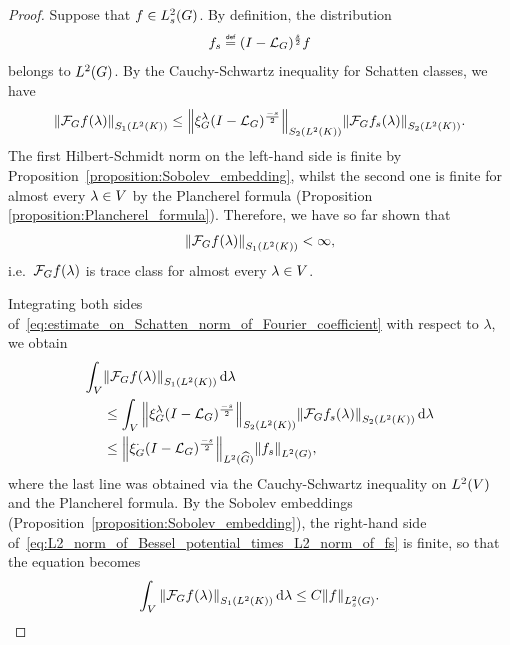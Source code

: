 \begin{proof}
    Suppose that $f \in \Sobolev s$.
    By definition, the distribution
    \begin{align*}
        f_s \defeq \BesselPotential s f
    \end{align*}
    belongs to $\Lebesgue 2 \Group$.
    By the Cauchy-Schwartz inequality for Schatten classes,
    we have
    \begin{align}
        \norm [\SchattenClasses 1 {\Lebesgue 2 \CompactGroup}] {\Fourier f(\lambda)}
        \leq
        \norm [\SchattenClasses 2 {\Lebesgue 2 \CompactGroup}] {\Rep \lambda \BesselPotential {-s}}
        \norm [\SchattenClasses 2 {\Lebesgue 2 \CompactGroup}] {\Fourier f_s(\lambda)}.
        \label{eq:estimate_on_Schatten_norm_of_Fourier_coefficient}
    \end{align}
    The first Hilbert-Schmidt norm on the left-hand side is finite by Proposition~\ref{proposition:Sobolev_embedding},
    whilst the second one is finite for almost every $\lambda \in \VectorSpace$ by the Plancherel formula (Proposition \ref{proposition:Plancherel_formula}).
    Therefore, we have so far shown that
    \begin{align*}
        \norm [\SchattenClasses 1 {\Lebesgue 2 \CompactGroup}] {\Fourier f(\lambda)}
        < \infty,
    \end{align*}
    i.e.\ $\Fourier f(\lambda)$ is trace class for almost every $\lambda \in \VectorSpace$.

    Integrating both sides of~\eqref{eq:estimate_on_Schatten_norm_of_Fourier_coefficient} with respect to $\lambda$,
    we obtain
    \begin{align}
        \int_\VectorSpace
            &\norm [\SchattenClasses 1 {\Lebesgue 2 \CompactGroup}] {\Fourier f(\lambda)}
        \dd \lambda \notag\\
        &\leq
        \int_\VectorSpace
            \norm [\SchattenClasses 2 {\Lebesgue 2 \CompactGroup}] {\Rep \lambda \BesselPotential {-s}}
            \norm [\SchattenClasses 2 {\Lebesgue 2 \CompactGroup}] {\Fourier f_s(\lambda)}
        \dd \lambda \notag\\
        &\leq
        \norm [\LebesgueDual 2 \Group] {\Rep \dummy \BesselPotential {-s}}
        \norm [\Lebesgue 2 \Group] {f_s},
        \label{eq:L2_norm_of_Bessel_potential_times_L2_norm_of_fs}
    \end{align}
    where the last line was obtained via the Cauchy-Schwartz inequality on $\Lebesgue 2 \VectorSpace$
    and the Plancherel formula.
    By the Sobolev embeddings (Proposition~\ref{proposition:Sobolev_embedding}),
    the right-hand side of~\eqref{eq:L2_norm_of_Bessel_potential_times_L2_norm_of_fs} is finite,
    so that the equation becomes
    \begin{align}
        \int_\VectorSpace
            \norm [\SchattenClasses 1 {\Lebesgue 2 \CompactGroup}] {\Fourier f(\lambda)}
        \dd \lambda
        \leq C \norm [\Sobolev s] {f}.
        \label{eq:Sobolev_inclusion_into_fields_with_integrable_S1_norm}
    \end{align}


\end{proof}
